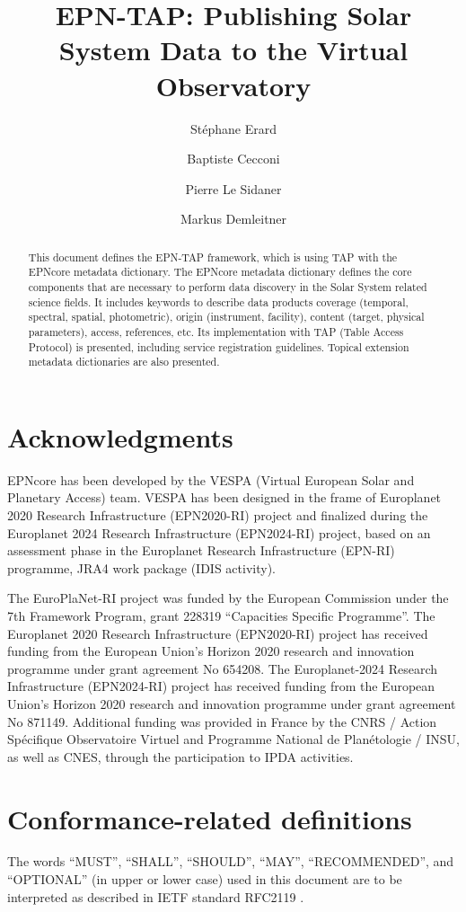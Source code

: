 \documentclass[11pt,a4paper]{ivoa}
\title{EPN-TAP: Publishing Solar System Data to the Virtual Observatory}
\author{St\'ephane Erard}
\author{Baptiste Cecconi}
\author{Pierre Le Sidaner}
\author{Markus Demleitner}
\begin{document}
\begin{abstract}
This document defines the EPN-TAP framework, which is using TAP with the EPNcore metadata dictionary. The EPNcore metadata dictionary defines the core components that are necessary 
to perform data discovery in the Solar System related science fields. It includes keywords to describe data products coverage (temporal, spectral, 
spatial, photometric), origin (instrument, facility), content (target, physical parameters), access, references, etc. Its implementation with TAP (Table Access Protocol) is presented, including service registration guidelines. Topical extension metadata dictionaries are also presented.
\end{abstract}


\section*{Acknowledgments}

EPNcore has been developed by the VESPA (Virtual European Solar and Planetary Access) team. 
VESPA has been designed in the frame of Europlanet 2020 Research Infrastructure (EPN2020-RI) project and finalized during the Europlanet 2024 Research Infrastructure (EPN2024-RI) project, based on an assessment phase in the Europlanet Research Infrastructure (EPN-RI) programme, JRA4 work package (IDIS activity).

The EuroPlaNet-RI project was funded by the European Commission under the 7th Framework Program, grant 228319 ``Capacities Specific Programme''.
The Europlanet 2020 Research Infrastructure (EPN2020-RI) project has received funding from the European Union's Horizon 2020 research and innovation programme under grant agreement No 654208. 
The Europlanet-2024 Research Infrastructure (EPN2024-RI) project has received funding from the European Union's Horizon 2020 research and innovation programme under grant agreement No 871149.
Additional funding was provided in France by the CNRS / Action Sp\'ecifique Observatoire Virtuel and Programme National de Plan\'etologie / INSU, as well as CNES, through the participation to IPDA activities.

\section*{Conformance-related definitions}

The words ``MUST'', ``SHALL'', ``SHOULD'', ``MAY'', ``RECOMMENDED'', and
``OPTIONAL'' (in upper or lower case) used in this document are to be
interpreted as described in IETF standard RFC2119 \citep{std:RFC2119}.
\end{document}
